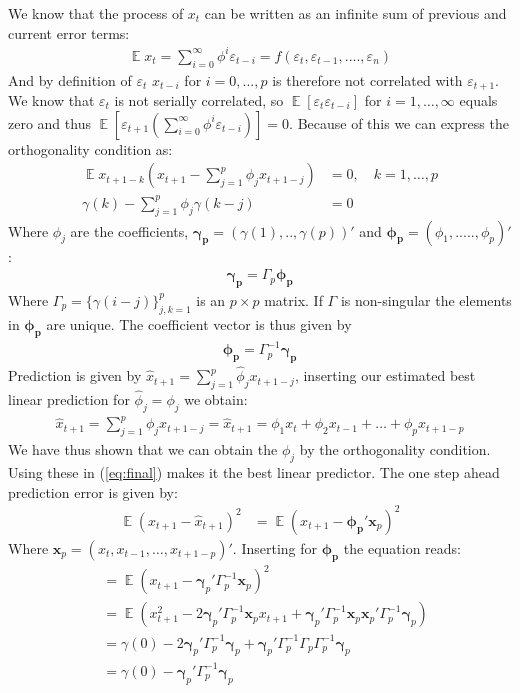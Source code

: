 \documentclass{article}
\DeclareMathOperator{\E}{\mathbb{E}}
\begin{document}
We know that the process of $x_t$ can be written as an infinite sum of previous and current error terms:
\begin{align*}
\E x_t=\sum^\infty_{i=0}\phi^i\varepsilon_{t-i}=f(\varepsilon_t,\varepsilon_{t-1},....,\varepsilon_n)
\end{align*}
And by definition of $\varepsilon_t$ $x_{t-i}$ for $i=0, ..., p$ is therefore not correlated with $\varepsilon_{t+1}$. We know that $\varepsilon_t$ is not serially correlated, so $\E[\varepsilon_{t}\varepsilon_{t-i}]$ for $i=1, \dots, \infty$ equals zero and thus $\E[\varepsilon_{t+1} \left(\sum^\infty_{i=0}\phi^i\varepsilon_{t-i}\right)] = 0$.
Because of this we can express the orthogonality condition as:
\begin{align*}
\E x_{t+1-k}(x_{t+1}-\sum_{j=1}^p \phi_{j} x_{t+1-j})&=0, \quad k=1,\dots,p\\
\gamma(k)-\sum_{j=1}^p \phi_{j}\gamma(k-j)&=0
\end{align*}
Where $\phi_{j}$ are the coefficients, $\boldsymbol{\gamma_p}=(\gamma(1),..,\gamma(p))'$ and $\boldsymbol{\phi_p}=(\phi_1,.....,\phi_p)'$:
\begin{align*}
\boldsymbol{\gamma_p} = \Gamma_p\boldsymbol{\phi_p}
\end{align*}
Where $\Gamma_p=\{\gamma(i-j)\}_{j,k=1}^p$ is an $p \times p$ matrix. If $\Gamma$ is non-singular the elements in $\boldsymbol{\phi_p}$ are unique. The coefficient vector is thus given by
\begin{align*}
\boldsymbol{\phi_p}=\Gamma_p^{-1}\boldsymbol{\gamma_p}
\end{align*}
Prediction is given by $\hat{x}_{t+1}=\sum^p_{j=1}\hat \phi_jx_{t+1-j}$, inserting our estimated best linear prediction for $\hat \phi_j=\phi_j$ we obtain:
\begin{align}
\label{eq:final}
\hat{x}_{t+1}=\sum^p_{j=1}\phi_jx_{t+1-j}=\hat{x}_{t+1}=\phi_1x_t+ \phi_2 x_{t-1} + \dots+\phi_{p} x_{t+1-p}
\end{align}
We have thus shown that we can obtain the $\phi_j$ by the orthogonality condition. Using these in (\ref{eq:final}) makes it the best linear predictor. 
The one step ahead prediction error is given by: 
\begin{align*}
\E(x_{t+1}-\hat{x}_{t+1})^2&=\E(x_{t+1}-\boldsymbol{\phi_p}'\boldsymbol x_p)^2
\end{align*}
Where $\boldsymbol x_p = (x_t, x_{t-1}, \dots, x_{t+1-p})'$. 
Inserting for $\boldsymbol{\phi_p}$ the equation reads:
\begin{align*}
& = \E(x_{t+1}-\boldsymbol\gamma_p'\Gamma^{-1}_p\boldsymbol x_p)^2\\
& = \E(x^2_{t+1}-2\boldsymbol\gamma_p'\Gamma^{-1}_p \boldsymbol x_p  x_{t+1} +\boldsymbol\gamma_p'\Gamma^{-1}_p \boldsymbol x_p \boldsymbol x_p'\Gamma^{-1}_p \boldsymbol\gamma_p)\\
& =\gamma(0) - 2\boldsymbol\gamma_p'\Gamma^{-1}_p \boldsymbol \gamma_p+\boldsymbol\gamma_p'\Gamma^{-1}_p\Gamma_p\Gamma^{-1}_p\boldsymbol\gamma_p\\
& =\gamma(0) - \boldsymbol\gamma_p'\Gamma^{-1}_p\boldsymbol\gamma_p
\end{align*}
\end{document}
